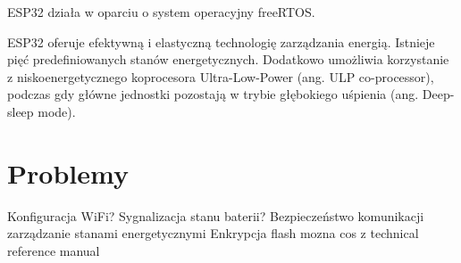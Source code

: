 ESP32 działa w oparciu o system operacyjny freeRTOS.

ESP32 oferuje efektywną i elastyczną technologię zarządzania energią. Istnieje pięć predefiniowanych stanów energetycznych. Dodatkowo umożliwia korzystanie z niskoenergetycznego koprocesora Ultra-Low-Power (ang. ULP co-processor), podczas gdy główne jednostki pozostają w trybie głębokiego uśpienia (ang. Deep-sleep mode).~\cite{esp32-tech-ref-man}


\section{Problemy}
Konfiguracja WiFi?
Sygnalizacja stanu baterii?
Bezpieczeństwo komunikacji
zarządzanie stanami energetycznymi
Enkrypcja flash
mozna cos z technical reference manual